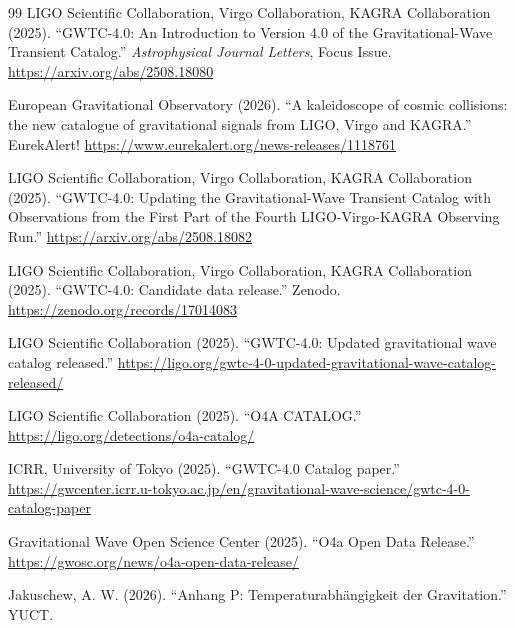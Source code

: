\documentclass[12pt,a4paper]{article}
\theoremstyle{remark}
\begin{document}
\begin{thebibliography}{99}
		LIGO Scientific Collaboration, Virgo Collaboration, KAGRA Collaboration (2025). ``GWTC-4.0: An Introduction to Version 4.0 of the Gravitational-Wave Transient Catalog.'' \textit{Astrophysical Journal Letters}, Focus Issue. \url{https://arxiv.org/abs/2508.18080}
		
		European Gravitational Observatory (2026). ``A kaleidoscope of cosmic collisions: the new catalogue of gravitational signals from LIGO, Virgo and KAGRA.'' EurekAlert! \url{https://www.eurekalert.org/news-releases/1118761}
		
		LIGO Scientific Collaboration, Virgo Collaboration, KAGRA Collaboration (2025). ``GWTC-4.0: Updating the Gravitational-Wave Transient Catalog with Observations from the First Part of the Fourth LIGO-Virgo-KAGRA Observing Run.'' \url{https://arxiv.org/abs/2508.18082}
		
		LIGO Scientific Collaboration, Virgo Collaboration, KAGRA Collaboration (2025). ``GWTC-4.0: Candidate data release.'' Zenodo. \url{https://zenodo.org/records/17014083}
		
		LIGO Scientific Collaboration (2025). ``GWTC-4.0: Updated gravitational wave catalog released.'' \url{https://ligo.org/gwtc-4-0-updated-gravitational-wave-catalog-released/}
		
		LIGO Scientific Collaboration (2025). ``O4A CATALOG.'' \url{https://ligo.org/detections/o4a-catalog/}
		
		ICRR, University of Tokyo (2025). ``GWTC-4.0 Catalog paper.'' \url{https://gwcenter.icrr.u-tokyo.ac.jp/en/gravitational-wave-science/gwtc-4-0-catalog-paper}
		
		Gravitational Wave Open Science Center (2025). ``O4a Open Data Release.'' \url{https://gwosc.org/news/o4a-open-data-release/}
		
		Jakuschew, A. W. (2026). ``Anhang P: Temperaturabhängigkeit der Gravitation.'' YUCT.
	\end{thebibliography}
	
\end{document}
